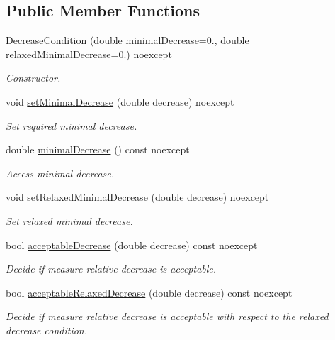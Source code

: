 \subsection*{Public Member Functions}
\begin{DoxyCompactItemize}
\item 
\hyperlink{classSpacy_1_1Mixin_1_1DecreaseCondition_a84c30dd2da669f79e5a771ffaa51874c}{Decrease\+Condition} (double \hyperlink{classSpacy_1_1Mixin_1_1DecreaseCondition_a8e0fba73f86381f6c7479f1a0d524be6}{minimal\+Decrease}=0., double relaxed\+Minimal\+Decrease=0.) noexcept
\begin{DoxyCompactList}\small\item\em Constructor. \end{DoxyCompactList}\item 
void \hyperlink{classSpacy_1_1Mixin_1_1DecreaseCondition_aeebecf3cbbbb6cd2631abe7fd3888aad}{set\+Minimal\+Decrease} (double decrease) noexcept
\begin{DoxyCompactList}\small\item\em Set required minimal decrease. \end{DoxyCompactList}\item 
double \hyperlink{classSpacy_1_1Mixin_1_1DecreaseCondition_a8e0fba73f86381f6c7479f1a0d524be6}{minimal\+Decrease} () const noexcept
\begin{DoxyCompactList}\small\item\em Access minimal decrease. \end{DoxyCompactList}\item 
void \hyperlink{classSpacy_1_1Mixin_1_1DecreaseCondition_a396bb6f45eb4533e07fa1d174d84ca9f}{set\+Relaxed\+Minimal\+Decrease} (double decrease) noexcept
\begin{DoxyCompactList}\small\item\em Set relaxed minimal decrease. \end{DoxyCompactList}\item 
bool \hyperlink{classSpacy_1_1Mixin_1_1DecreaseCondition_a11426318e1cc6d06b6251636d2a14389}{acceptable\+Decrease} (double decrease) const noexcept
\begin{DoxyCompactList}\small\item\em Decide if measure relative decrease is acceptable. \end{DoxyCompactList}\item 
bool \hyperlink{classSpacy_1_1Mixin_1_1DecreaseCondition_a343f1fa78010d07db49f36da46495ad5}{acceptable\+Relaxed\+Decrease} (double decrease) const noexcept
\begin{DoxyCompactList}\small\item\em Decide if measure relative decrease is acceptable with respect to the relaxed decrease condition. \end{DoxyCompactList}\end{DoxyCompactItemize}


